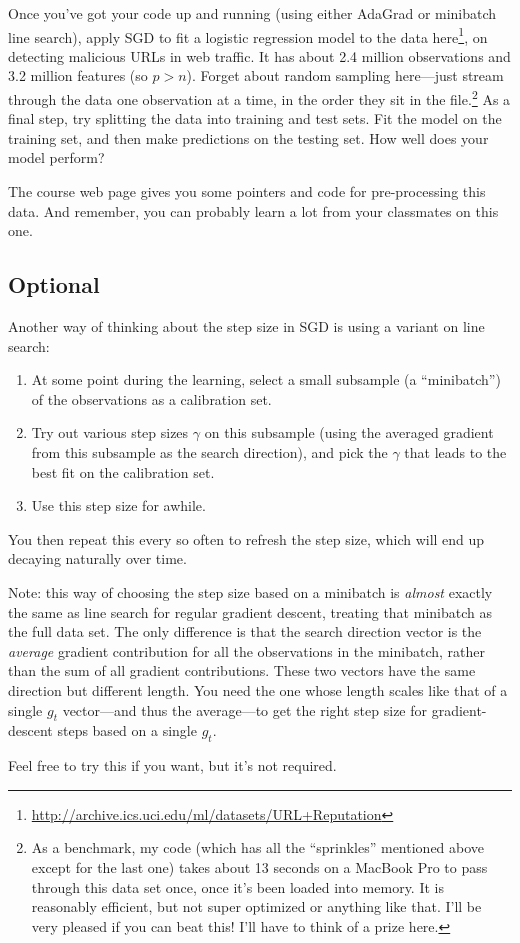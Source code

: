 \documentclass[11 pt]{article}
\begin{document}
Once you've got your code up and running (using either AdaGrad or minibatch line search), apply SGD to fit a logistic regression model to the data here\footnote{\url{http://archive.ics.uci.edu/ml/datasets/URL+Reputation}}, on detecting malicious URLs in web traffic.  It has about 2.4 million observations and 3.2 million features (so $p > n$).   Forget about random sampling here---just stream through the data one observation at a time, in the order they sit in the file.\footnote{As a benchmark, my code (which has all the ``sprinkles'' mentioned above except for the last one) takes about 13 seconds on a MacBook Pro to pass through this data set once, once it's been loaded into memory.  It is reasonably efficient, but not super optimized or anything like that.   I'll be very pleased if you can beat this!  I'll have to think of a prize here.}  As a final step, try splitting the data into training and test sets.  Fit the model on the training set, and then make predictions on the testing set.  How well does your model perform?

The course web page gives you some pointers and code for pre-processing this data.  And remember, you can probably learn a lot from your classmates on this one.

\newpage
\subsection{Optional}


Another way of thinking about the step size in SGD is using a variant on line search:
\begin{enumerate}[label=\arabic*.]
	\item At some point during the learning, select a small subsample (a ``minibatch'') of the observations as a calibration set.
	\item Try out various step sizes $\gamma$ on this subsample (using the averaged gradient from this subsample as the search direction), and pick the $\gamma$ that leads to the best fit on the calibration set.
	\item Use this step size for awhile.
\end{enumerate}
You then repeat this every so often to refresh the step size, which will end up decaying naturally over time.

Note: this way of choosing the step size based on a minibatch is \textit{almost} exactly the same as line search for regular gradient descent, treating that minibatch as the full data set.  The only difference is that the search direction vector is the \textit{average} gradient contribution for all the observations in the minibatch, rather than the sum of all gradient contributions.  These two vectors have the same direction but different length.  You need the one whose length scales like that of a single $g_t$ vector---and thus the average---to get the right step size for gradient-descent steps based on a single $g_t$.

Feel free to try this if you want, but it's not required.
	
	
	
	



	
\end{document}
